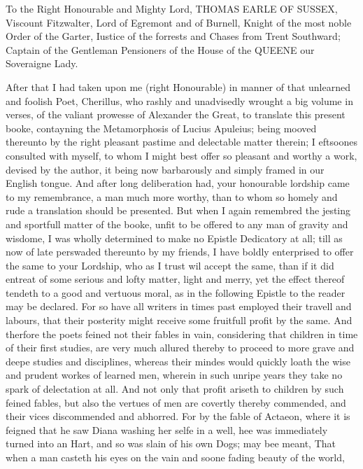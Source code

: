 
To the Right Honourable and Mighty Lord, THOMAS EARLE OF SUSSEX, Viscount
Fitzwalter, Lord of Egremont and of Burnell, Knight of the most noble Order of
the Garter, Iustice of the forrests and Chases from Trent Southward; Captain of
the Gentleman Pensioners of the House of the QUEENE our Soveraigne Lady.

After that I had taken upon me (right Honourable) in manner of that unlearned
and foolish Poet, Cherillus, who rashly and unadvisedly wrought a big volume in
verses, of the valiant prowesse of Alexander the Great, to translate this
present booke, contayning the Metamorphosis of Lucius Apuleius; being mooved
thereunto by the right pleasant pastime and delectable matter therein; I
eftsoones consulted with myself, to whom I might best offer so pleasant and
worthy a work, devised by the author, it being now barbarously and simply
framed in our English tongue. And after long deliberation had, your honourable
lordship came to my remembrance, a man much more worthy, than to whom so homely
and rude a translation should be presented. But when I again remembred the
jesting and sportfull matter of the booke, unfit to be offered to any man of
gravity and wisdome, I was wholly determined to make no Epistle Dedicatory at
all; till as now of late perswaded thereunto by my friends, I have boldly
enterprised to offer the same to your Lordship, who as I trust wil accept the
same, than if it did entreat of some serious and lofty matter, light and merry,
yet the effect thereof tendeth to a good and vertuous moral, as in the
following Epistle to the reader may be declared. For so have all writers in
times past employed their travell and labours, that their posterity might
receive some fruitfull profit by the same. And therfore the poets feined not
their fables in vain, considering that children in time of their first studies,
are very much allured thereby to proceed to more grave and deepe studies and
disciplines, whereas their mindes would quickly loath the wise and prudent
workes of learned men, wherein in such unripe years they take no spark of
delectation at all. And not only that profit ariseth to children by such feined
fables, but also the vertues of men are covertly thereby commended, and their
vices discommended and abhorred. For by the fable of Actaeon, where it is
feigned that he saw Diana washing her selfe in a well, hee was immediately
turned into an Hart, and so was slain of his own Dogs; may bee meant, That when
a man casteth his eyes on the vain and soone fading beauty of the world,
